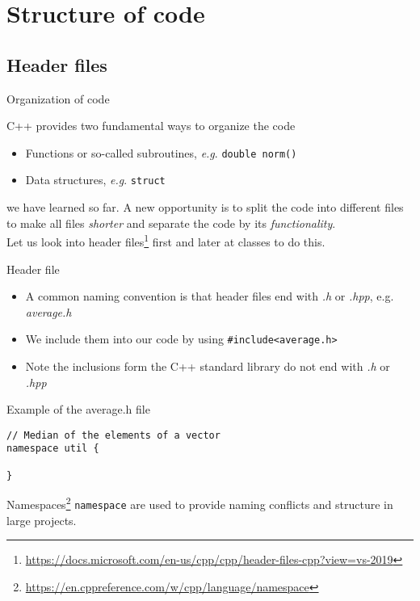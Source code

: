 \documentclass[12pt,t]{beamer}
\begin{document}
\section{Structure of code}


\subsection{Header files}

\begin{frame}{Organization of code}
\begin{block}{C++ provides two fundamental ways to organize the code}
\begin{itemize}
\item Functions or so-called subroutines, \emph{e.g}. \lstinline|double norm()|
\item Data structures, \emph{e.g}. \lstinline|struct|
\end{itemize}
\end{block}
we have learned so far. A new opportunity is to split the code into different files to make all files \textit{shorter} and separate the code by its \textit{functionality}. \\
\vspace{0.25cm}
Let us look into header files\footnote{\tiny\url{https://docs.microsoft.com/en-us/cpp/cpp/header-files-cpp?view=vs-2019}} first and later at classes to do this.

\end{frame}

\begin{frame}[fragile]{Header file}
\begin{itemize}
\item A common naming convention is that header files end with \textit{.h} or \textit{.hpp}, e.g. \textit{average.h}
\item We include them into our code by using \lstinline|#include<average.h>|
\item Note the inclusions form the C++ standard library do not end with \textit{.h} or \textit{.hpp}
\end{itemize}

\begin{block}{Example of the average.h file}
\begin{lstlisting}
// Median of the elements of a vector
namespace util {

}
\end{lstlisting}
\end{block}
Namespaces\footnote{\tiny\url{https://en.cppreference.com/w/cpp/language/namespace}} \lstinline|namespace| are used to provide naming conflicts
and structure in large projects.
\end{frame}
\end{document}
